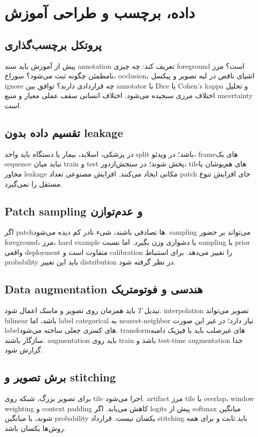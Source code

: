 \documentclass[12pt,openany,oneside]{book}
\begin{document}
\section{داده، برچسب و طراحی آموزش}
\subsection{پروتکل برچسب‌گذاری}
پیش از آموزش باید سند annotation تعریف کند: چه چیزی foreground است؟ مرز نامطمئن چگونه ثبت می‌شود؟ سوراخ،
occlusion، اشیای ناقص در لبه تصویر و پیکسل ignore چه قراردادی دارند؟ توافق بین annotator با Dice یا Cohen's kappa
و تحلیل اختلاف مرزی سنجیده می‌شود. اختلاف انسانی سقف عملی معیار و منبع uncertainty است.

\subsection{تقسیم داده بدون leakage}
در پزشکی، اسلاید، بیمار یا دستگاه باید واحد split باشد؛ در ویدئو، frameهای یک sequence نباید میان train و test پخش
شوند؛ در سنجش‌ازدور، tileهای هم‌پوشان یا مجاور leakage مکانی ایجاد می‌کنند. افزایش مصنوعی تعداد patch جای افزایش
تنوع مستقل را نمی‌گیرد.

\subsection{Patch sampling و عدم‌توازن}
اگر patchها تصادفی باشند، شیء نادر کم دیده می‌شود. sampling می‌تواند بر حضور foreground، مرز، hard example یا
دشواری وزن بگیرد. اما نسبت sampling با prior واقعی deployment متفاوت است و calibration را تغییر می‌دهد. برای
استنباط probability باید این تغییر distribution در نظر گرفته شود.

\subsection{Data augmentation هندسی و فوتومتریک}
تبدیل \(T\) باید همزمان روی تصویر و ماسک اعمال شود. interpolation تصویر می‌تواند bilinear باشد، اما label categorical
به nearest-neighbor نیاز دارد؛ در غیر این صورت labelهای کسری جعلی ساخته می‌شود. transformهای غیرصلب باید با
فیزیک دامنه سازگار باشند. augmentation باید روی train باشد و test-time augmentation جدا گزارش شود.

\subsection{برش تصویر و stitching}
برای تصویر بزرگ، شبکه روی tile اجرا می‌شود. artifact مرز tile با overlap، window weighting و context padding کاهش
می‌یابد. اگر logits پیش از softmax میانگین شوند، با میانگین probability یکسان نیست. قرارداد stitching باید ثابت و
برای همه روش‌ها یکسان باشد.
\end{document}
